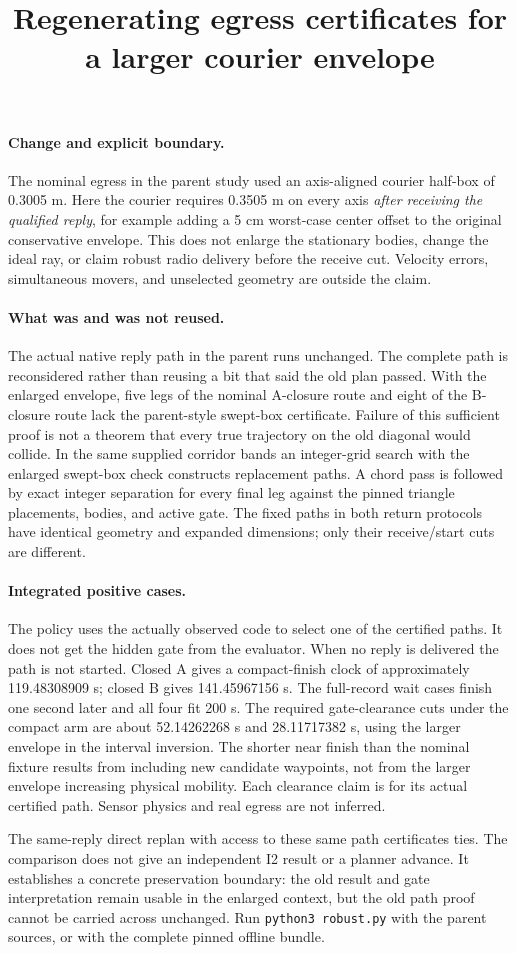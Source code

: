\documentclass{article}
\title{Regenerating egress certificates for a larger courier envelope}
\author{}
\date{}
\begin{document}
\maketitle
\paragraph{Change and explicit boundary.}
The nominal egress in the parent study used an axis-aligned
courier half-box of 0.3005 m. Here the courier requires 0.3505 m
on every axis \emph{after receiving the qualified reply}, for
example adding a 5 cm worst-case center offset to the original
conservative envelope. This does not enlarge the stationary
bodies, change the ideal ray, or claim robust radio delivery
before the receive cut. Velocity errors, simultaneous movers,
and unselected geometry are outside the claim.

\paragraph{What was and was not reused.}
The actual native reply path in the parent runs unchanged.
The complete path is reconsidered rather than reusing a bit
that said the old plan passed. With the enlarged envelope,
five legs of the nominal A-closure route and eight of the
B-closure route lack the parent-style swept-box certificate.
Failure of this sufficient proof is not a theorem that every
true trajectory on the old diagonal would collide. In the same
supplied corridor bands an integer-grid search with the enlarged
swept-box check constructs replacement paths. A chord pass is
followed by exact integer separation for every final leg against
the pinned triangle placements, bodies, and active gate.
The fixed paths in both return protocols have identical
geometry and expanded dimensions; only their receive/start
cuts are different.

\paragraph{Integrated positive cases.}
The policy uses the actually observed code to select one of
the certified paths. It does not get the hidden gate from the
evaluator. When no reply is delivered the path is not started.
Closed A gives a compact-finish clock of approximately
119.48308909 s; closed B gives 141.45967156 s. The full-record
wait cases finish one second later and all four fit 200 s.
The required gate-clearance cuts under the compact arm are
about 52.14262268 s and 28.11717382 s, using the larger
envelope in the interval inversion. The shorter near
finish than the nominal fixture results from including new
candidate waypoints, not from the larger envelope increasing
physical mobility. Each clearance claim is for its actual
certified path. Sensor physics and real egress are not inferred.

The same-reply direct replan with access to these same path
certificates ties. The comparison does not give an
independent I2 result or a planner advance. It establishes
a concrete preservation boundary: the old result and gate
interpretation remain usable in the enlarged context, but
the old path proof cannot be carried across unchanged.
Run \texttt{python3 robust.py} with the parent sources, or
with the complete pinned offline bundle.
\end{document}
